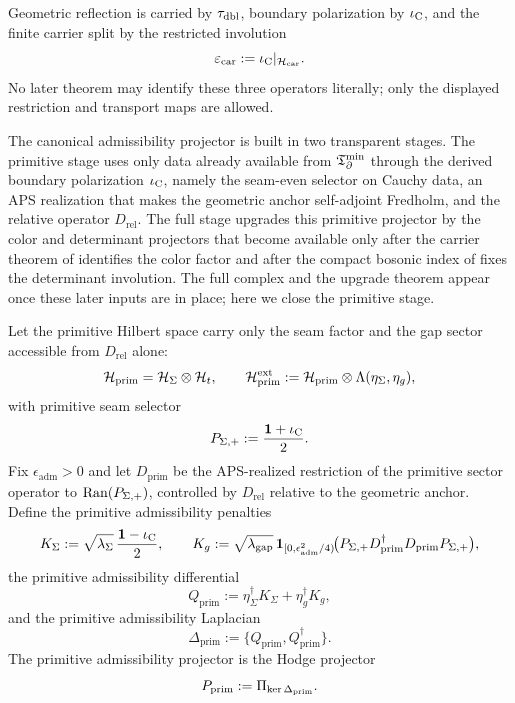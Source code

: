 \begin{corollary}
Geometric reflection is carried by $\tau_{\mathrm{dbl}}$, boundary polarization by $\iota_{\mathrm C}$, and the finite
carrier split by the restricted involution
\[
\varepsilon_{\mathrm{car}}:=\iota_{\mathrm C}|_{\mathcal H_{\mathrm{car}}}.
\]
No later theorem may identify these three operators literally; only the displayed restriction and
transport maps are allowed.
\end{corollary}

The canonical admissibility projector is built in two transparent stages. The primitive stage
uses only data already available from $\mathfrak T_{\partial}^{\min}$ through the derived boundary polarization $\iota_{\mathrm C}$,
namely the seam-even selector on Cauchy data, an APS realization that makes the geometric anchor
self-adjoint Fredholm, and the relative operator $D_{\mathrm{rel}}$. The full stage upgrades this
primitive projector by the color and determinant projectors that become available only after the
carrier theorem of  identifies the color factor and after the
compact bosonic index of  fixes the determinant involution. The full
complex and the upgrade theorem appear once these later inputs are in place; here we close the
primitive stage.

\begin{definition}
\label{def:admissibility-complex}
\label{def:primitive-admissibility-complex}
Let the primitive Hilbert space carry only the seam factor and the gap sector accessible from
$D_{\mathrm{rel}}$ alone:
\[
\mathcal H_{\mathrm{prim}}=\mathcal H_{\Sigma}\otimes\mathcal H_t,
\qquad
\mathcal H_{\mathrm{prim}}^{\mathrm{ext}}
:=
\mathcal H_{\mathrm{prim}}\otimes\Lambda(\eta_\Sigma,\eta_g),
\]
with primitive seam selector
\[
P_{\Sigma,+}:=\frac{\mathbf 1+\iota_{\mathrm C}}{2}.
\]
Fix $\epsilon_{\mathrm{adm}}>0$ and let $D_{\mathrm{prim}}$ be the APS-realized restriction of
the primitive sector operator to $\mathrm{Ran}(P_{\Sigma,+})$, controlled by $D_{\mathrm{rel}}$
relative to the geometric anchor. Define the primitive admissibility penalties
\[
K_\Sigma:=\sqrt{\lambda_\Sigma}\,\frac{\mathbf 1-\iota_{\mathrm C}}{2},
\qquad
K_g:=\sqrt{\lambda_{\mathrm{gap}}}\,
\mathbf 1_{[0,\epsilon_{\mathrm{adm}}^2/4)}\!
\bigl(P_{\Sigma,+}D_{\mathrm{prim}}^\dagger D_{\mathrm{prim}}P_{\Sigma,+}\bigr),
\]
the primitive admissibility differential
\[
Q_{\mathrm{prim}}
:=
\eta_\Sigma^\dagger K_\Sigma
+\eta_g^\dagger K_g,
\]
and the primitive admissibility Laplacian
\[
\Delta_{\mathrm{prim}}:=\{Q_{\mathrm{prim}},Q_{\mathrm{prim}}^\dagger\}.
\]
The primitive admissibility projector is the Hodge projector
\[
P_{\mathrm{prim}}
:=
\Pi_{\ker\Delta_{\mathrm{prim}}}.
\]
\end{definition}

